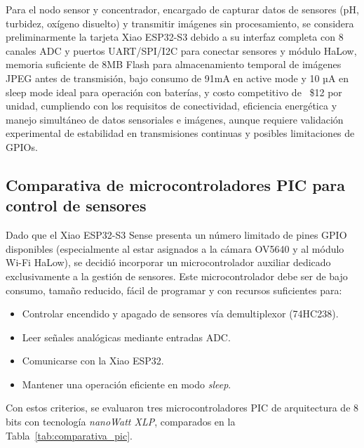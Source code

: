 Para el nodo sensor y concentrador, encargado de capturar datos de sensores (pH, turbidez, oxígeno disuelto) y transmitir imágenes sin procesamiento, se considera preliminarmente la tarjeta Xiao ESP32-S3 debido a su interfaz completa con 8 canales ADC y puertos UART/SPI/I2C para conectar sensores y módulo HaLow, memoria suficiente de 8MB Flash para almacenamiento temporal de imágenes JPEG antes de transmisión, bajo consumo de 91mA en active mode y 10 µA en sleep mode ideal para operación con baterías, y costo competitivo de ~\$12 por unidad, cumpliendo con los requisitos de conectividad, eficiencia energética y manejo simultáneo de datos sensoriales e imágenes, aunque requiere validación experimental de estabilidad en transmisiones continuas y posibles limitaciones de GPIOs.

\subsection{Comparativa de microcontroladores PIC para control de sensores}
\label{subsec:comparativa_pic}

Dado que el Xiao ESP32-S3 Sense presenta un número limitado de pines GPIO disponibles (especialmente al estar asignados a la cámara OV5640 y al módulo Wi-Fi HaLow), se decidió incorporar un microcontrolador auxiliar dedicado exclusivamente a la gestión de sensores. Este microcontrolador debe ser de bajo consumo, tamaño reducido, fácil de programar y con recursos suficientes para:

\begin{itemize}
    \item Controlar encendido y apagado de sensores vía demultiplexor (74HC238).
    \item Leer señales analógicas mediante entradas ADC.
    \item Comunicarse con la Xiao ESP32.
    \item Mantener una operación eficiente en modo \textit{sleep}.
\end{itemize}

Con estos criterios, se evaluaron tres microcontroladores PIC de arquitectura de 8 bits con tecnología \textit{nanoWatt XLP}, comparados en la Tabla~\ref{tab:comparativa_pic}.


